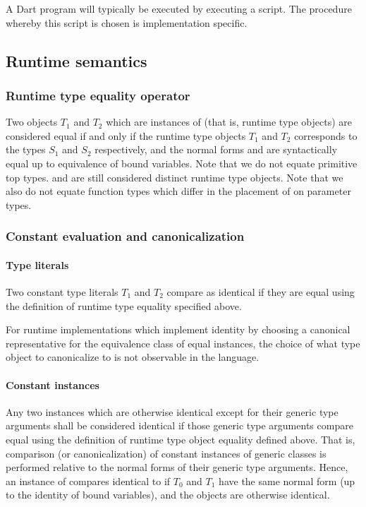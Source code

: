 \documentclass[makeidx]{article}
\begin{document}
{A Dart program will typically be executed by executing a script.  The
procedure whereby this script is chosen is implementation specific.

\subsection{Runtime semantics}

\subsubsection{Runtime type equality operator}

Two objects $T_1$ and $T_2$ which are instances of  (that is, runtime type
objects) are considered equal if and only if the runtime type objects $T_1$ and
$T_2$ corresponds to the types $S_1$ and $S_2$ respectively, and the normal forms
 and  are syntactically equal up to equivalence of
bound variables. Note that we do not equate primitive top types.  
and  are still considered distinct runtime type objects.  Note
that we also do not equate function
types which differ in the placement of \REQUIRED{} on parameter types.

\subsubsection{Constant evaluation and canonicalization}

\paragraph{Type literals}

Two constant type literals $T_1$ and $T_2$ compare as identical if they
are equal using the definition of runtime type equality specified above.

For runtime implementations which implement identity by choosing a
canonical representative for the equivalence class of equal instances,
the choice of what type object to canonicalize to is not
observable in the language.

\paragraph{Constant instances}

Any two
instances which are otherwise identical except for their generic type arguments
shall be considered identical if those generic type arguments compare equal
using the definition of runtime type object equality defined above.  That is,
comparison (or canonicalization) of constant instances of generic classes is
performed relative to the normal forms of their generic type arguments.
Hence, an instance of
 compares identical to  if $T_0$ and $T_1$ have the same normal form
(up to the identity of bound variables), and the objects are otherwise
identical.

}
\end{document}
